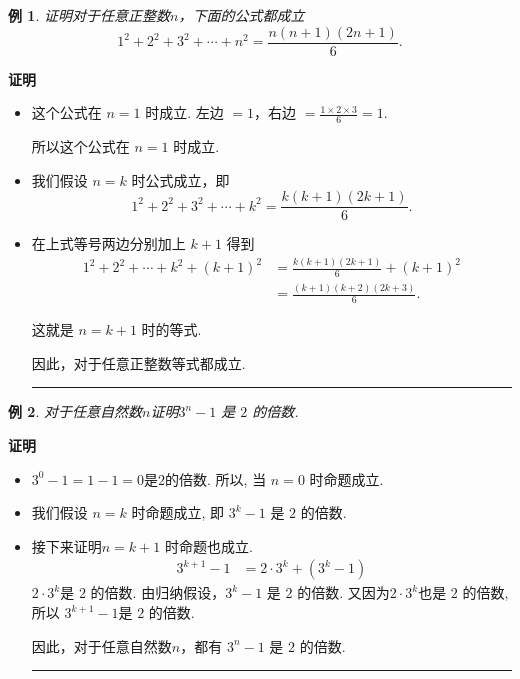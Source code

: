 \documentclass[11pt,punct]{ctexbeamer}
\newtheorem{ex}{例}
\def\qed{\nopagebreak\hfill{\rule{4pt}{7pt}}\medbreak}
\def\pf{{\bf 证明~~ }}
\begin{document}
\begin{frame}
    \begin{ex}
        证明对于任意正整数$n$，下面的公式都成立
        \[
        1^2+2^2+3^2+\cdots+n^2=\frac{n(n+1)(2n+1)}{6}.
        \]
    \end{ex}

    \pause
    \pf
    \begin{itemize}
        \item 这个公式在 $n=1$ 时成立.  左边 $= 1$，右边 $= \frac{1 \times 2 \times 3}{6}  = 1$.

        所以这个公式在 $n=1$ 时成立.
        \item 我们假设 $n=k$ 时公式成立，即
        \[
    1^2+2^2+3^2+\cdots+k^2=\frac{k(k+1)(2k+1)}{6}.
        \]
        \item 在上式等号两边分别加上 $k+1$ 得到
\begin{align*}
1^2+2^2+\cdots+k^2+(k+1)^2
& = \frac{k(k+1)(2k+1)}{6}+(k+1)^2\\
& = \frac{(k+1)(k+2)(2k+3)}{6}.
\end{align*}

        这就是 $n=k+1$ 时的等式.

        因此，对于任意正整数等式都成立. \qed
    \end{itemize}
\end{frame}



\begin{frame}
\begin{ex}
对于任意自然数$n$证明$3^n−1$ 是 $2$ 的倍数.
\end{ex}

\pause
\pf

\begin{itemize}
	\item  $3^0−1 = 1−1 = 0$是$ 2 $的倍数.  所以, 当 $n=0$ 时命题成立.
	\item 我们假设 $n=k$ 时命题成立, 即 $3^{k}−1$ 是 $2$ 的倍数.
	\item 接下来证明$n=k+1$ 时命题也成立.
	\begin{align*}
		3^{k+1}-1 & = 2 \cdot 3^{k}+(3^{k}-1 )
	\end{align*}
	$2 \cdot 3^{k}$是 $2$ 的倍数.
	由归纳假设，$3^{k}−1$ 是 $2$ 的倍数.
	又因为$2 \cdot 3^{k}$也是 $2$ 的倍数,
	所以	$3^{k+1}-1$是 $2$ 的倍数.

	因此，对于任意自然数$n$，都有 $3^n−1$ 是 $2$ 的倍数.
	 \qed
\end{itemize}
\end{frame}
\end{document}
